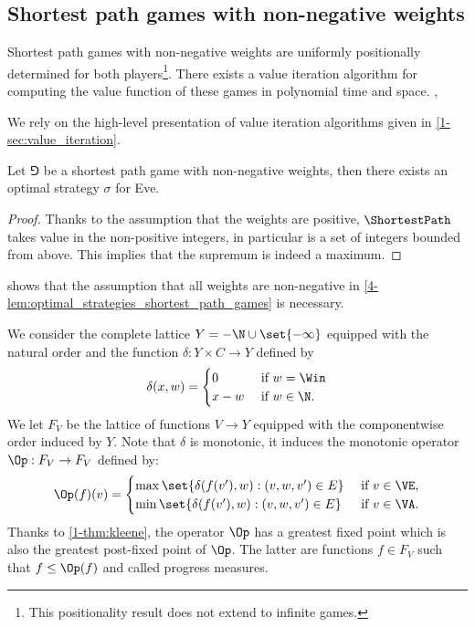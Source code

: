 \subsection*{Shortest path games with non-negative weights}
\begin{theorem}
\label{4-thm:shortest path-positive}
Shortest path games with non-negative weights are uniformly positionally determined for both players\footnote{This positionality result does not extend to infinite games.}.
There exists a value iteration algorithm for computing the value function of these games in polynomial time and space.
, 
\end{theorem}

We rely on the high-level presentation of value iteration algorithms given in \cref{1-sec:value_iteration}.
\begin{lemma}
\label{4-lem:optimal_strategies_shortest_path_games}
Let $\Game$ be a shortest path game with non-negative weights, then there exists an optimal strategy $\sigma$ for Eve.
\end{lemma}

\begin{proof}
Thanks to the assumption that the weights are positive,
$\ShortestPath$ takes value in the non-positive integers, in particular is a set of integers bounded from above.
This implies that the supremum is indeed a maximum.
\end{proof}

 shows that the assumption that all weights are non-negative 
in \cref{4-lem:optimal_strategies_shortest_path_games} is necessary.

We consider the complete lattice $Y = -\N \cup \set{-\infty}$ equipped with the natural order and the function $\delta : Y \times C \to Y$ defined by
\[
\delta(x, w) = 
\begin{cases}
0 & \text{ if } w = \Win \\
x - w & \text{ if } w \in \N.
\end{cases}
\]
We let $F_V$ be the lattice of functions $V \to Y$ equipped with the componentwise order induced by $Y$.
Note that $\delta$ is monotonic, it induces the monotonic operator $\Op : F_V \to F_V$ defined by:
\[
\Op(f)(v) = 
\begin{cases}
\max \set{\delta( f(v'), w) : (v,w,v') \in E} & \text{ if } v \in \VE, \\
\min \set{\delta( f(v'), w) : (v,w,v') \in E} & \text{ if } v \in \VA.
\end{cases}
\]
Thanks to \cref{1-thm:kleene}, the operator $\Op$ has a greatest fixed point which is also the greatest post-fixed point of $\Op$.
The latter are functions $f \in F_V$ such that $f \le \Op(f)$ and called progress measures.

